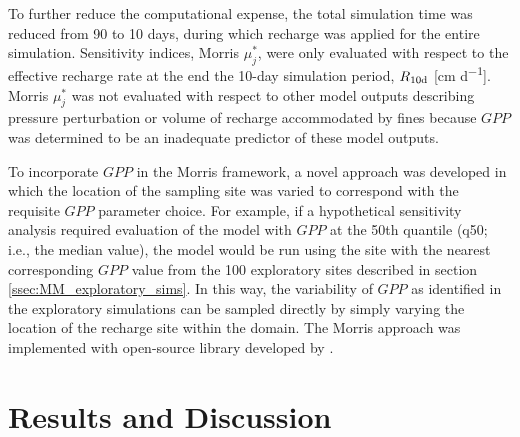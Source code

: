 To further reduce the computational expense, the total simulation time was reduced from 90 to 10 days, during which recharge was applied for the entire simulation. Sensitivity indices, Morris $\mu_j^*$, were only evaluated with respect to the effective recharge rate at the end the 10-day simulation period, $R\textsubscript{10d}$ [cm d\textsuperscript{$-1$}]. Morris $\mu_j^*$ was not evaluated with respect to other model outputs describing pressure perturbation or volume of recharge accommodated by fines because $GPP$ was determined to be an inadequate predictor of these model outputs.

To incorporate $GPP$ in the Morris framework, a novel approach was developed in which the location of the sampling site was varied to correspond with the requisite $GPP$ parameter choice. For example, if a hypothetical sensitivity analysis required evaluation of the model with $GPP$ at the 50th quantile (q50; i.e., the median value), the model would be run using the site with the nearest corresponding $GPP$ value from the 100 exploratory sites described in section \ref{ssec:MM_exploratory_sims}. In this way, the variability of $GPP$ as identified in the exploratory simulations can be sampled directly  by simply varying the location of the recharge site within the domain. The Morris approach was implemented with open-source library developed by \cite{herman2017salib}.

\section{Results and Discussion} \label{sec:RD}
